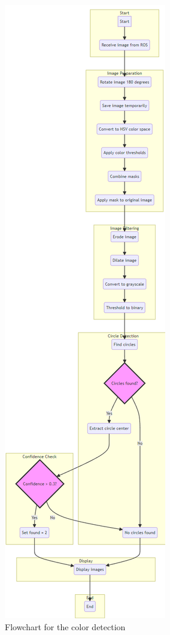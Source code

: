 \documentclass{article}
\begin{document}
	\begin{figure}[!h]
		\centering
		\includegraphics[width=.25\textheight]{fig/fig9.png}
		\caption{Flowchart for the color detection}
	\end{figure}
	\clearpage
\end{document}
